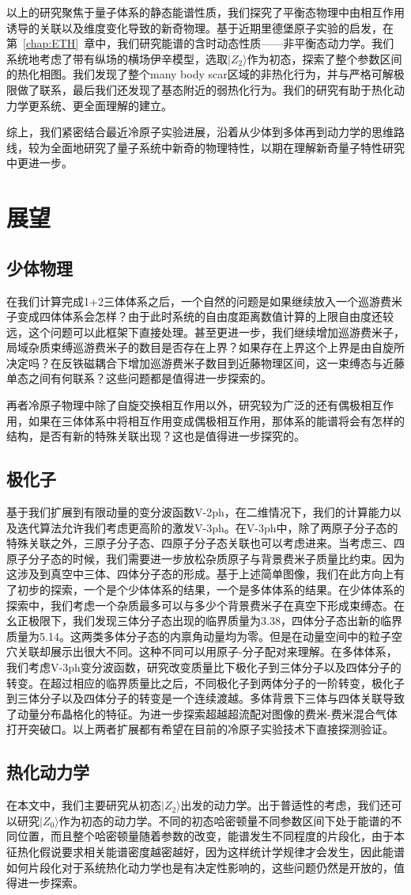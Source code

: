 以上的研究聚焦于量子体系的静态能谱性质，我们探究了平衡态物理中由相互作用诱导的关联以及维度变化导致的新奇物理。基于近期里德堡原子实验的启发，在第~\ref{chap:ETH}~章中，我们研究能谱的含时动态性质——非平衡态动力学。我们系统地考虑了带有纵场的横场伊辛模型，选取$|Z_2\rangle$作为初态，探索了整个参数区间的热化相图。我们发现了整个many body scar区域的非热化行为，并与严格可解极限做了联系，最后我们还发现了基态附近的弱热化行为。我们的研究有助于热化动力学更系统、更全面理解的建立。

综上，我们紧密结合最近冷原子实验进展，沿着从少体到多体再到动力学的思维路线，较为全面地研究了量子系统中新奇的物理特性，以期在理解新奇量子特性研究中更进一步。


\section{展望}
\subsection{少体物理}
在我们计算完成1+2三体体系之后，一个自然的问题是如果继续放入一个巡游费米子变成四体体系会怎样？由于此时系统的自由度距离数值计算的上限自由度还较远，这个问题可以此框架下直接处理。甚至更进一步，我们继续增加巡游费米子，局域杂质束缚巡游费米子的数目是否存在上界？如果存在上界这个上界是由自旋所决定吗？在反铁磁耦合下增加巡游费米子数目到近藤物理区间，这一束缚态与近藤单态之间有何联系？这些问题都是值得进一步探索的。

再者冷原子物理中除了自旋交换相互作用以外，研究较为广泛的还有偶极相互作用，如果在三体体系中将相互作用变成偶极相互作用，那体系的能谱将会有怎样的结构，是否有新的特殊关联出现？这也是值得进一步探究的。

\subsection{极化子}
基于我们扩展到有限动量的变分波函数V-2ph，在二维情况下，我们的计算能力以及迭代算法允许我们考虑更高阶的激发V-3ph。在V-3ph中，除了两原子分子态的特殊关联之外，三原子分子态、四原子分子态关联也可以考虑进来。当考虑三、四原子分子态的时候，我们需要进一步放松杂质原子与背景费米子质量比约束。因为这涉及到真空中三体、四体分子态的形成。基于上述简单图像，我们在此方向上有了初步的探索，一个是个少体体系的结果\cite{RuijinUniversal}，一个是多体体系的结果\cite{RuijinEmergence}。在少体体系的探索中，我们考虑一个杂质最多可以与多少个背景费米子在真空下形成束缚态。在幺正极限下，我们发现三体分子态出现的临界质量为3.38，四体分子态出新的临界质量为5.14。这两类多体分子态的内禀角动量均为零。但是在动量空间中的粒子空穴关联却展示出很大不同。这种不同可以用原子-分子配对来理解。在多体体系，我们考虑V-3ph变分波函数，研究改变质量比下极化子到三体分子以及四体分子的转变。在超过相应的临界质量比之后，不同极化子到两体分子的一阶转变，极化子到三体分子以及四体分子的转变是一个连续渡越。多体背景下三体与四体关联导致了动量分布晶格化的特征。为进一步探索超越超流配对图像的费米-费米混合气体打开突破口。以上两者扩展都有希望在目前的冷原子实验技术下直接探测验证。

\subsection{热化动力学}
在本文中，我们主要研究从初态$|Z_2\rangle$出发的动力学。出于普适性的考虑，我们还可以研究$|Z_0\rangle$作为初态的动力学。不同的初态哈密顿量不同参数区间下处于能谱的不同位置，而且整个哈密顿量随着参数的改变，能谱发生不同程度的片段化，由于本征热化假说要求相关能谱密度越密越好，因为这样统计学规律才会发生，因此能谱如何片段化对于系统热化动力学也是有决定性影响的，这些问题仍然是开放的，值得进一步探索。
